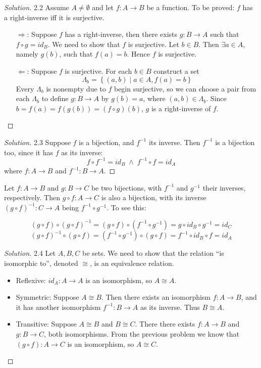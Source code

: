 \documentclass{article}
\theoremstyle{definition}
\newcommand{\AND}{\;\wedge\;}
\newcommand{\set}[1]{\left\{#1\right\}}
\theoremstyle{definition}
\newenvironment{solution}{%
  \begin{proof}[Solution]
  \vspace{-8px}
  \setlength{\parskip}{4px}
  \setlength{\parindent}{0px}
}{
  \end{proof}
}
\begin{document}
\begin{solution}
2.2 Assume $A \neq \emptyset$ and let $f \colon A \to B$ be a function. To be proved: $f$ has a right-inverse iff it is surjective.
\begin{itemize}
\item[$\Longrightarrow$:] Suppose $f$ has a right-inverse, then there exists $g \colon B \to A$ such that $f \circ g = id_B$. We need to show that $f$ is surjective. Let $b \in B$. Then $\exists a \in A$, namely $g(b)$, such that $f(a) = b$. Hence $f$ is surjective.
\item[$\Longleftarrow$:] Suppose $f$ is surjective. For each $b \in B$ construct a set
\[ \Lambda_b = \set{(a,b) \mid a \in A, f(a) = b} \]
Every $\Lambda_b$ is nonempty due to $f$ begin surjective, so we can choose a
pair from each $\Lambda_b$ to define $g \colon B \to A$ by $g(b) = a$, where
$(a,b) \in \Lambda_b$. Since $b = f(a) = f(g(b)) = (f \circ g)(b)$, $g$ is a
right-inverse of $f$.
\end{itemize}
\end{solution}

\begin{solution}
2.3 Suppose $f$ is a bijection, and $f^{-1}$ its inverse. Then $f^{-1}$ is a bijection too, since it has $f$ as its inverse: 
\[f \circ f^{-1} = id_B \AND f^{-1} \circ f = id_A \]
where $f \colon A \to B$ and $f^{-1} \colon B \to A$.
\end{solution}
Let $f\colon A \to B$ and $g\colon B \to C$ be two bijections, with $f^{-1}$
and $g^{-1}$ their inverses, respectively. Then $g \circ f \colon A \to C$ is
also a bijection, with its inverse $(g\circ f)^{-1}\colon C \to A$ being $f^{-1} \circ g^{-1}$. To see this:

\[(g \circ f)\circ {(g\circ f)}^{-1} = (g\circ f) \circ (f^{-1}\circ g^{-1}) = g \circ id_B \circ g^{-1} = id_C \]
\[{(g\circ f)}^{-1}\circ (g \circ f) = (f^{-1}\circ g^{-1}) \circ (g\circ f) = f^{-1} \circ id_B \circ f = id_A \]

\begin{solution}
2.4 Let $A,B,C$ be sets. We need to show that the relation ``is isomorphic
to'', denoted $\cong$, is an equivalence relation.
\begin{itemize}
\item Reflexive: $id_A\colon A \to A$ is an isomorphism, so $A\cong A$.
\item Symmetric: Suppose $A \cong B$. Then there exists an isomorphism $f\colon A \to B$, and it has another isomorphism $f^{-1}\colon B \to A$ as its inverse. Thus $B\cong A$.
\item Transitive: Suppose $A\cong B$ and $B\cong C$. There there exists $f\colon A \to B$ and $g\colon B \to C$, both isomorphisms. From the previous problem we know that $(g \circ f)\colon A \to C$ is an isomorphism, so $A \cong C$.
\end{itemize}
\end{solution}
\end{document}
